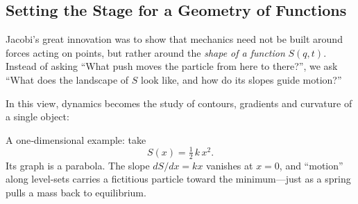   
  
  





\subsection{Setting the Stage for a Geometry of Functions}

Jacobi’s great innovation was to show that mechanics need not be built around forces acting on points, but rather around the \emph{shape of a function} \(S(q,t)\).  Instead of asking “What push moves the particle from here to there?”, we ask “What does the landscape of \(S\) look like, and how do its slopes guide motion?”

In this view, dynamics becomes the study of contours, gradients and curvature of a single object:

  A one‐dimensional example: take 
  \[
    S(x) = \tfrac12\,k\,x^2.
  \]
  Its graph is a parabola.  The slope \(dS/dx = kx\) vanishes at \(x=0\), and “motion” along level‐sets carries a fictitious particle toward the minimum—just as a spring pulls a mass back to equilibrium.

